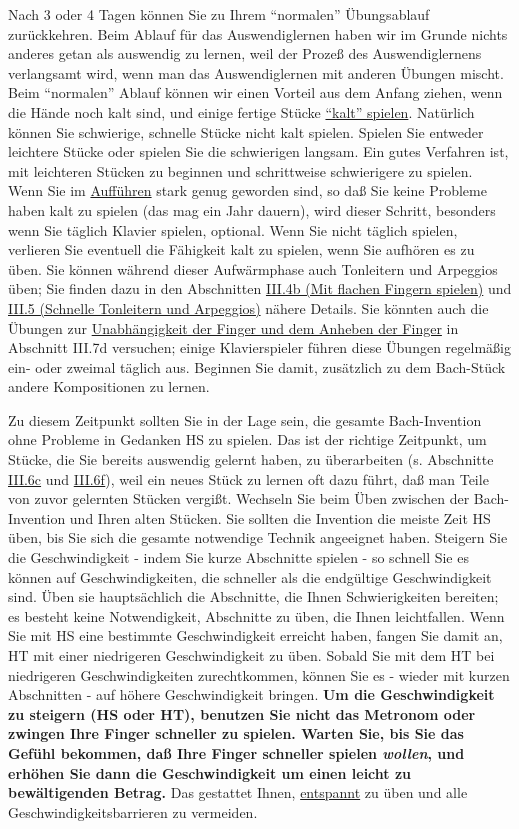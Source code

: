 Nach 3 oder 4 Tagen können Sie zu Ihrem \enquote{normalen} Übungsablauf zurückkehren.
Beim Ablauf für das Auswendiglernen haben wir im Grunde nichts anderes getan als auswendig zu lernen, weil der Prozeß des Auswendiglernens verlangsamt wird, wenn man das Auswendiglernen mit anderen Übungen mischt.
Beim \enquote{normalen} Ablauf können wir einen Vorteil aus dem Anfang ziehen, wenn die Hände noch kalt sind, und einige fertige Stücke \hyperlink{c1iii6g}{\enquote{kalt} spielen}.
Natürlich können Sie schwierige, schnelle Stücke nicht kalt spielen.
Spielen Sie entweder leichtere Stücke oder spielen Sie die schwierigen langsam.
Ein gutes Verfahren ist, mit leichteren Stücken zu beginnen und schrittweise schwierigere zu spielen.
Wenn Sie im \hyperlink{c1iii14}{Aufführen} stark genug geworden sind, so daß Sie keine Probleme haben kalt zu spielen (das mag ein Jahr dauern), wird dieser Schritt, besonders wenn Sie täglich Klavier spielen, optional.
Wenn Sie nicht täglich spielen, verlieren Sie eventuell die Fähigkeit kalt zu spielen, wenn Sie aufhören es zu üben.
Sie können während dieser Aufwärmphase auch Tonleitern und Arpeggios üben; Sie finden dazu in den Abschnitten \hyperlink{c1iii4b}{III.4b (Mit flachen Fingern spielen)} und \hyperlink{c1iii5}{III.5 (Schnelle Tonleitern und Arpeggios)} nähere Details.
Sie könnten auch die Übungen zur \hyperlink{c1iii7d}{Unabhängigkeit der Finger und dem Anheben der Finger} in Abschnitt III.7d versuchen; einige Klavierspieler führen diese Übungen regelmäßig ein- oder zweimal täglich aus.
Beginnen Sie damit, zusätzlich zu dem Bach-Stück andere Kompositionen zu lernen.

Zu diesem Zeitpunkt sollten Sie in der Lage sein, die gesamte Bach-Invention ohne Probleme in Gedanken HS zu spielen.
Das ist der richtige Zeitpunkt, um Stücke, die Sie bereits auswendig gelernt haben, zu überarbeiten (s. Abschnitte \hyperlink{c1iii6c}{III.6c} und \hyperlink{c1iii6f}{III.6f}), weil ein neues Stück zu lernen oft dazu führt, daß man Teile von zuvor gelernten Stücken vergißt.
Wechseln Sie beim Üben zwischen der Bach-Invention und Ihren alten Stücken.
Sie sollten die Invention die meiste Zeit HS üben, bis Sie sich die gesamte notwendige Technik angeeignet haben.
Steigern Sie die Geschwindigkeit - indem Sie kurze Abschnitte spielen - so schnell Sie es können auf Geschwindigkeiten, die schneller als die endgültige Geschwindigkeit sind.
Üben sie hauptsächlich die Abschnitte, die Ihnen Schwierigkeiten bereiten; es besteht keine Notwendigkeit, Abschnitte zu üben, die Ihnen leichtfallen.
Wenn Sie mit HS eine bestimmte Geschwindigkeit erreicht haben, fangen Sie damit an, HT mit einer niedrigeren Geschwindigkeit zu üben.
Sobald Sie mit dem HT bei niedrigeren Geschwindigkeiten zurechtkommen, können Sie es - wieder mit kurzen Abschnitten - auf höhere Geschwindigkeit bringen.
\textbf{Um die Geschwindigkeit zu steigern (HS oder HT), benutzen Sie nicht das Metronom oder zwingen Ihre Finger schneller zu spielen. Warten Sie, bis Sie das Gefühl bekommen, daß Ihre Finger schneller spielen \textit{wollen}, und erhöhen Sie dann die Geschwindigkeit um einen leicht zu bewältigenden Betrag.}
Das gestattet Ihnen, \hyperlink{c1ii14}{entspannt} zu üben und alle Geschwindigkeitsbarrieren zu vermeiden.

